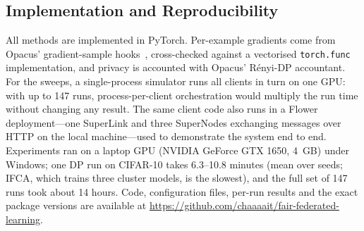 \subsection{Implementation and Reproducibility}
All methods are implemented in PyTorch. Per-example gradients come from Opacus' gradient-sample
hooks~\cite{yousefpour2021opacus}, cross-checked against a vectorised \texttt{torch.func} implementation, and privacy
is accounted with Opacus' R\'enyi-DP accountant. For the sweeps, a single-process simulator runs all clients in turn
on one GPU: with up to 147 runs, process-per-client orchestration would multiply the run time without changing any
result. The same client code also runs in a Flower~\cite{beutel2020flower} deployment---one SuperLink and three
SuperNodes exchanging messages over HTTP on the local machine---used to demonstrate the system end to end. Experiments ran on a laptop GPU
(NVIDIA GeForce GTX 1650, 4~GB) under Windows; one DP run on CIFAR-10 takes 6.3--10.8 minutes (mean over seeds; IFCA, which trains three cluster models, is the
slowest), and the full set of 147 runs took about 14 hours. Code,
configuration files, per-run results and the exact package versions are available at
\url{https://github.com/chaaaait/fair-federated-learning}.
